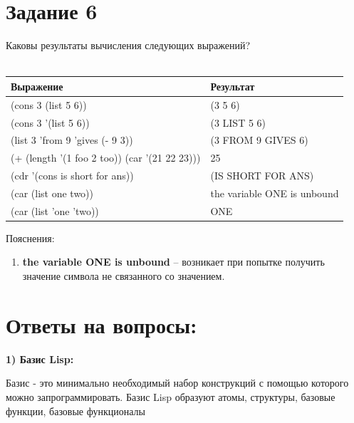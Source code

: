 \documentclass[a4paper, 12pt]{article}
\begin{document}
\section*{Задание 6}
Каковы результаты вычисления следующих выражений?\\ \\
\hspace*{10mm}\begin{tabular}{ | l | l | }
	\hline
	\textbf{Выражение} & \textbf{Результат} \\ \hline
	(cons 3 (list 5 6)) & (3 5 6) \\ \hline
	(cons 3 '(list 5 6)) & (3 LIST 5 6) \\ \hline
	(list 3 'from 9 'gives (- 9 3)) & (3 FROM 9 GIVES 6) \\ \hline
	(+ (length '(1 foo 2 too)) (car '(21 22 23))) & 25 \\ \hline
	(cdr '(cons is short for ans)) & (IS SHORT FOR ANS) \\ \hline
	(car (list one two)) & the variable ONE is unbound \\ \hline
	(car (list 'one 'two)) & ONE \\ \hline
\end{tabular}
\clearpage
\newpage
Пояснения:
\begin{enumerate}
	\item \textbf{the variable ONE is unbound} – возникает при попытке получить значение символа не связанного со значением.
\end{enumerate}

\section*{Ответы на вопросы:}
\hspace*{-7mm} \textbf{1) Базис Lisp:}

\hspace*{-6mm}Базис - это минимально необходимый набор конструкций с помощью которого можно запрограммировать. Базис Lisp образуют атомы, структуры, базовые функции, базовые функционалы
\end{document}
